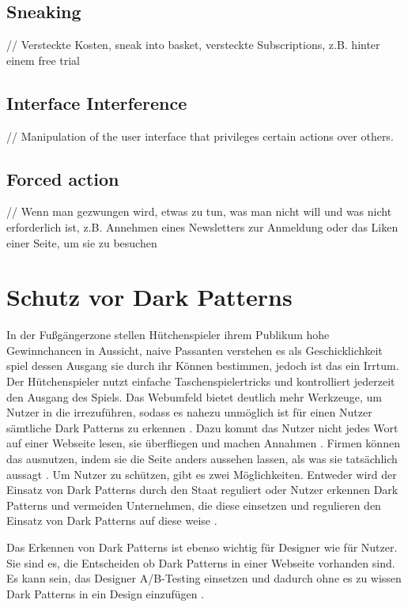\documentclass[conference,compsoc,final,a4paper]{IEEEtran}
\begin{document}
\subsection{Sneaking}
// Versteckte Kosten, sneak into basket, versteckte Subscriptions, z.B. hinter einem free trial
\subsection{Interface Interference}
// Manipulation of the user interface that privileges certain actions over others.
\subsection{Forced action}
// Wenn man gezwungen wird, etwas zu tun, was man nicht will und was nicht erforderlich ist, z.B. Annehmen eines Newsletters zur Anmeldung oder das Liken einer Seite, um sie zu besuchen


\section{Schutz vor Dark Patterns}

In der Fußgängerzone stellen Hütchenspieler ihrem Publikum hohe Gewinnchancen in Aussicht, naive Passanten verstehen es als Geschicklichkeit spiel dessen Ausgang sie durch ihr Können bestimmen, jedoch ist das ein Irrtum. Der Hütchenspieler nutzt einfache Taschenspielertricks und kontrolliert jederzeit den Ausgang des Spiels. Das Webumfeld bietet deutlich mehr Werkzeuge, um Nutzer in die irrezuführen, sodass es nahezu unmöglich ist für einen Nutzer sämtliche Dark Patterns zu erkennen \autocite{M.Bhoot2020}. Dazu kommt das Nutzer nicht jedes Wort auf einer Webseite lesen, sie überfliegen und machen Annahmen \autocite{Brignull}. Firmen können das ausnutzen, indem sie die Seite anders aussehen lassen, als was sie tatsächlich aussagt \autocite{Brignull}. Um Nutzer zu schützen, gibt es zwei Möglichkeiten. Entweder wird der Einsatz von Dark Patterns durch den Staat reguliert oder Nutzer erkennen Dark Patterns und vermeiden Unternehmen, die diese einsetzen und regulieren den Einsatz von Dark Patterns auf diese weise \autocite{Narayanan2020}.

Das Erkennen von Dark Patterns ist ebenso wichtig für Designer wie für Nutzer. Sie sind es, die Entscheiden ob Dark Patterns in einer Webseite vorhanden sind. Es kann sein, das Designer A/B-Testing einsetzen und dadurch ohne es zu wissen Dark Patterns in ein Design einzufügen \autocite{Narayanan2020}.
\end{document}
